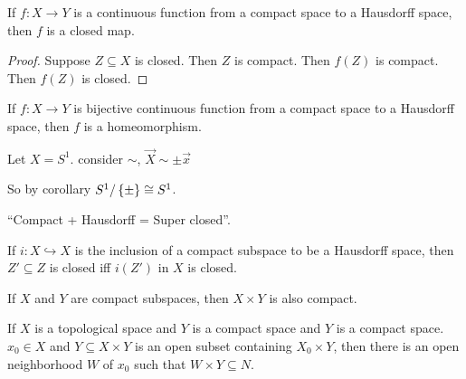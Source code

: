 \documentclass[12pt, twosided]{article}
\begin{document}
\begin{cor}
  If \(f:X \to Y\) is a continuous function from a compact space to a Hausdorff space, then \(f\) is a closed map.
\end{cor}

\begin{proof}
  Suppose \(Z \subseteq X\) is closed. Then \(Z\) is compact. Then \(f(Z)\) is compact. Then \(f(Z)\) is closed.
\end{proof}
\begin{cor}
  If \(f:X \to Y\) is bijective continuous function from a compact space to a Hausdorff space, then \(f\) is a homeomorphism.
\end{cor}

\begin{exa}
  Let \(X = S^1\). consider \(\sim\), \(\vec{X} \sim \pm \vec{x}\)

  \begin{center}
  \end{center}

  So by corollary \(S^1/\left\{ \pm \right\} \cong S^1\).
\end{exa}
\begin{framed}
  ``Compact + Hausdorff = Super closed''.

  If \(i: X \hookrightarrow X\) is the inclusion of a compact subspace to be a Hausdorff space, then \(Z\prime \subseteq Z\) is closed iff \(i(Z\prime)\) in \(X\) is closed.
\end{framed}
\begin{thm}
  If \(X\) and \(Y\) are compact subspaces, then \(X \times Y\) is also compact.
\end{thm}

\begin{lm}
  If \(X\) is a topological space and \(Y\) is a compact space and \(Y\) is a compact space. \(x_0 \in X\) and \(Y \subseteq X \times Y\) is an open subset containing \(X_0 \times Y\), then there is an open neighborhood \(W\) of \(x_0\) such that \(W \times Y \subseteq N\).
\end{lm}
\end{document}
